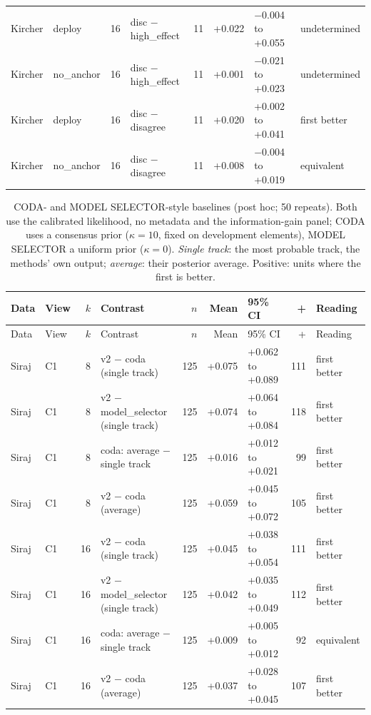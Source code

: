 {\begin{longtable}{llrlrrll}
Kircher & deploy & 16 & disc $-$ high\_effect & 11 & +0.022 & $-$0.004 to +0.055 & undetermined \\
Kircher & no\_anchor & 16 & disc $-$ high\_effect & 11 & +0.001 & $-$0.021 to +0.023 & undetermined \\
Kircher & deploy & 16 & disc $-$ disagree & 11 & +0.020 & +0.002 to +0.041 & first better \\
Kircher & no\_anchor & 16 & disc $-$ disagree & 11 & +0.008 & $-$0.004 to +0.019 & equivalent  \\
\bottomrule
\end{longtable}}

{\small\begin{longtable}{llrlrrlrl}
\caption{CODA- and MODEL SELECTOR-style baselines (post hoc; 50 repeats). Both use the calibrated likelihood, no metadata and the information-gain panel; CODA uses a consensus prior ($\kappa=10$, fixed on development elements), MODEL SELECTOR a uniform prior ($\kappa=0$). \emph{Single track}: the most probable track, the methods' own output; \emph{average}: their posterior average. Positive: units where the first is better.}\label{tab:s5}\\
\toprule
Data & View & $k$ & Contrast & $n$ & Mean & 95\% CI & + & Reading \\
\midrule
\endfirsthead
\toprule
Data & View & $k$ & Contrast & $n$ & Mean & 95\% CI & + & Reading \\
\midrule
\endhead
Siraj & C1 & 8 & v2 $-$ coda (single track) & 125 & +0.075 & +0.062 to +0.089 & 111 & first better \\
Siraj & C1 & 8 & v2 $-$ model\_selector (single track) & 125 & +0.074 & +0.064 to +0.084 & 118 & first better \\
Siraj & C1 & 8 & coda: average $-$ single track & 125 & +0.016 & +0.012 to +0.021 & 99 & first better \\
Siraj & C1 & 8 & v2 $-$ coda (average) & 125 & +0.059 & +0.045 to +0.072 & 105 & first better \\
Siraj & C1 & 16 & v2 $-$ coda (single track) & 125 & +0.045 & +0.038 to +0.054 & 111 & first better \\
Siraj & C1 & 16 & v2 $-$ model\_selector (single track) & 125 & +0.042 & +0.035 to +0.049 & 112 & first better \\
Siraj & C1 & 16 & coda: average $-$ single track & 125 & +0.009 & +0.005 to +0.012 & 92 & equivalent  \\
Siraj & C1 & 16 & v2 $-$ coda (average) & 125 & +0.037 & +0.028 to +0.045 & 107 & first better \\

\end{longtable}}
